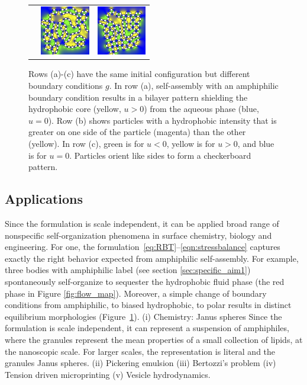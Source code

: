 \begin{figure}
\begin{center}
\begin{tabular}{m{0.9in}m{0.9in}m{0.9in}}
      &\includegraphics[width=0.85in]{figures/SpecificAim1/N100A2.jpg}
      &\includegraphics[width=0.85in]{figures/SpecificAim1/N100A3.jpg} 
  \end{tabular}
  \end{center}
  \vspace{-5pt}
  \caption{\footnotesize \label{fig:self-assembly2} Rows (a)-(c) have
  the same initial configuration but different boundary conditions $g$.
  In row (a), self-assembly with an amphiphilic boundary condition
  results in a bilayer pattern shielding the hydrophobic core (yellow,
  $u > 0$) from the aqueous phase (blue, $u = 0$). Row (b) shows
  particles with a hydrophobic intensity that is greater on one side of
  the particle (magenta) than the other (yellow). In row (c), green is
  for $u < 0$, yellow is for $u > 0$, and blue is for $u = 0$. Particles
  orient like sides to form a checkerboard pattern.}
\end{figure}
\subsection{Applications}
Since the formulation is scale independent,
it can be applied broad range of
nonspecific self-organization
phenomena in surface chemistry, biology and engineering.
For one,
the formulation~\eqref{eq:RBT}--\eqref{eqn:stressbalance} captures
exactly the right behavior expected from amphiphilic self-assembly.
For example, three bodies with amphiphilic label
(see section \ref{sec:specific_aim1}) spontaneously
self-organize to sequester the hydrophobic fluid phase
(the red phase in Figure \ref{fig:flow_map}).
Moreover, a simple change of boundary conditions from
amphiphilic, to biased hydrophobic, to polar results in distinct
equilibrium morphologies (Figure~\ref{fig:self-assembly2}).
(i)
Chemistry: Janus spheres
Since the formulation is
scale independent, it can represent a suspension of amphiphiles, where
the granules represent the mean properties of a small collection of
lipids, at the nanoscopic scale. For larger scales, the representation
is literal and the granules Janus spheres.
(ii) Pickering emulsion 
(iii) Bertozzi's problem
(iv) Tension driven microprinting
(v) Vesicle hydrodynamics.

